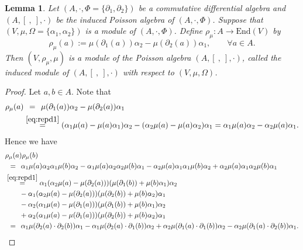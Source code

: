 \documentclass[pdftex]{sigma}
\numberwithin{equation}{section}
\newtheorem{Lemma}[Theorem]{Lemma}
\newcommand{\End}{\mathrm{End}}
\begin{document}
\begin{Lemma}\label{lem:rep_poisson}
 Let $(A, \cdot, \Phi = \{\partial_1, \partial_2\})$ be a commutative differential algebra and $(A, [\ ,\ ], \cdot)$ be the induced Poisson algebra of $(A, \cdot, \Phi)$.
 Suppose that $(V, \mu, \Omega = \{\alpha_1, \alpha_2\})$ is a module of $(A, \cdot, \Phi)$.
 Define $\rho_\mu\colon A \to \End (V)$ by
 \begin{equation}
 \rho_\mu(a) := \mu(\partial_1(a)) \alpha_2 - \mu(\partial_2(a))\alpha_1, \qquad
 \forall a \in A. \label{eq:def_rep_lie}
 \end{equation}
 Then $(V, \rho_\mu, \mu)$ is a module of the Poisson algebra $(A, [\ ,\ ], \cdot)$,
 called the \textit{induced module of $(A, [\ ,\ ], \cdot)$ with respect to $(V, \mu, \Omega)$}.
\end{Lemma}
\begin{proof}
 Let $a, b \in A$.
 Note that
 \begin{align*}
 	\rho_\mu(a) &\overset{\hphantom{(2.3)}}{=} \mu(\partial_1(a))\alpha_2 - \mu(\partial_2(a))\alpha_1 \\
 	&\overset{\eqref{eq:repd1}}{=} (\alpha_1 \mu(a) - \mu(a) \alpha_1)\alpha_2 - (\alpha_2 \mu(a) - \mu(a) \alpha_2)\alpha_1 = \alpha_1 \mu(a) \alpha_2 - \alpha_2 \mu(a) \alpha_1.
 \end{align*}
 Hence we have
 \begin{equation*}
 \begin{aligned}
 &\rho_\mu(a)\rho_\mu(b) \\
 &\overset{\hphantom{(2.3)}}{=} \alpha_1 \mu(a)\alpha_2 \alpha_1 \mu(b) \alpha_2 - \alpha_1 \mu(a)\alpha_2 \alpha_2 \mu(b) \alpha_1 - \alpha_2 \mu(a)\alpha_1 \alpha_1 \mu(b) \alpha_2 + \alpha_2 \mu(a)\alpha_1 \alpha_2 \mu(b) \alpha_1 \\
 &\overset{\eqref{eq:repd1}}{=} \alpha_1(\alpha_2 \mu(a) - \mu(\partial_2(a)))(\mu(\partial_1(b)) + \mu(b)\alpha_1) \alpha_2 \\
 &\qquad {}- \alpha_1(\alpha_2\mu(a)- \mu(\partial_2(a)))(\mu(\partial_2(b)) + \mu(b)\alpha_2)\alpha_1 \\
 & \qquad {}-\alpha_2(\alpha_1 \mu(a) - \mu(\partial_1(a)))(\mu(\partial_1(b)) + \mu(b)\alpha_1) \alpha_2 \\
 &\qquad {}+ \alpha_2(\alpha_1 \mu(a) - \mu(\partial_1(a)))(\mu(\partial_2(b)) + \mu(b)\alpha_2)\alpha_1 \\
 &\overset{\hphantom{(2.3)}}{=} \alpha_1 \mu(\partial_2(a) \cdot \partial_2(b)) \alpha_1 - \alpha_1 \mu(\partial_2(a) \cdot \partial_1(b)) \alpha_2 + \alpha_2 \mu(\partial_1(a) \cdot \partial_1(b)) \alpha_2 - \alpha_2 \mu(\partial_1(a) \cdot \partial_2(b)) \alpha_1.

\end{aligned}
\end{equation*}
\end{proof}
\end{document}
